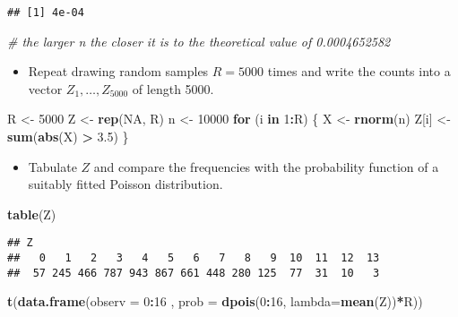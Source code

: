 \documentclass[]{article}
\newenvironment{Shaded}{\begin{snugshade}}{\end{snugshade}}
\newcommand{\KeywordTok}[1]{\textcolor[rgb]{0.13,0.29,0.53}{\textbf{#1}}}
\newcommand{\DataTypeTok}[1]{\textcolor[rgb]{0.13,0.29,0.53}{#1}}
\newcommand{\DecValTok}[1]{\textcolor[rgb]{0.00,0.00,0.81}{#1}}
\newcommand{\FloatTok}[1]{\textcolor[rgb]{0.00,0.00,0.81}{#1}}
\newcommand{\StringTok}[1]{\textcolor[rgb]{0.31,0.60,0.02}{#1}}
\newcommand{\CommentTok}[1]{\textcolor[rgb]{0.56,0.35,0.01}{\textit{#1}}}
\newcommand{\OtherTok}[1]{\textcolor[rgb]{0.56,0.35,0.01}{#1}}
\newcommand{\ControlFlowTok}[1]{\textcolor[rgb]{0.13,0.29,0.53}{\textbf{#1}}}
\newcommand{\OperatorTok}[1]{\textcolor[rgb]{0.81,0.36,0.00}{\textbf{#1}}}
\newcommand{\NormalTok}[1]{#1}
\providecommand{\tightlist}{%
  \setlength{\itemsep}{0pt}\setlength{\parskip}{0pt}}
\begin{document}
\begin{verbatim}
## [1] 4e-04
\end{verbatim}

\begin{Shaded}
\begin{Highlighting}[]
\CommentTok{# the larger n the closer it is to the theoretical value of 0.0004652582}
\end{Highlighting}
\end{Shaded}

\begin{itemize}
\tightlist
\item
  Repeat drawing random samples \(R=5000\) times and write the counts
  into a vector \(Z_{1},\ldots ,Z_{5000}\) of length 5000.
\end{itemize}

\begin{Shaded}
\begin{Highlighting}[]
\NormalTok{R <-}\StringTok{ }\DecValTok{5000}  
\NormalTok{Z <-}\StringTok{ }\KeywordTok{rep}\NormalTok{(}\OtherTok{NA}\NormalTok{, R)  }
\NormalTok{n <-}\StringTok{ }\DecValTok{10000}
\ControlFlowTok{for}\NormalTok{ (i }\ControlFlowTok{in} \DecValTok{1}\OperatorTok{:}\NormalTok{R) \{}
\NormalTok{    X <-}\StringTok{ }\KeywordTok{rnorm}\NormalTok{(n)}
\NormalTok{    Z[i] <-}\StringTok{ }\KeywordTok{sum}\NormalTok{(}\KeywordTok{abs}\NormalTok{(X) }\OperatorTok{>}\StringTok{ }\FloatTok{3.5}\NormalTok{)}
\NormalTok{\}}
\end{Highlighting}
\end{Shaded}

\begin{itemize}
\tightlist
\item
  Tabulate \(Z\) and compare the frequencies with the probability
  function of a suitably fitted Poisson distribution.
\end{itemize}

\begin{Shaded}
\begin{Highlighting}[]
\KeywordTok{table}\NormalTok{(Z)}
\end{Highlighting}
\end{Shaded}

\begin{verbatim}
## Z
##   0   1   2   3   4   5   6   7   8   9  10  11  12  13 
##  57 245 466 787 943 867 661 448 280 125  77  31  10   3
\end{verbatim}

\begin{Shaded}
\begin{Highlighting}[]
\KeywordTok{t}\NormalTok{(}\KeywordTok{data.frame}\NormalTok{(}\DataTypeTok{observ =} \DecValTok{0}\OperatorTok{:}\DecValTok{16}\NormalTok{ , }\DataTypeTok{prob =} \KeywordTok{dpois}\NormalTok{(}\DecValTok{0}\OperatorTok{:}\DecValTok{16}\NormalTok{, }\DataTypeTok{lambda=}\KeywordTok{mean}\NormalTok{(Z))}\OperatorTok{*}\NormalTok{R))}
\end{Highlighting}
\end{Shaded}
\end{document}
